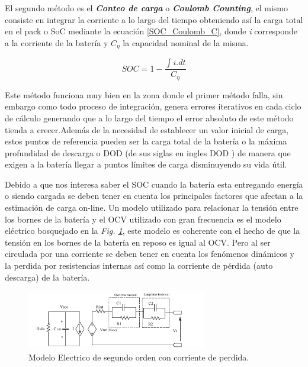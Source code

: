 \documentclass[10pt,a4paper]{article}
\begin{document}
	El segundo método es el \textbf{\emph{Conteo de carga}} o \textbf{\emph{Coulomb Counting}}, el mismo consiste en integrar la corriente a lo largo del tiempo obteniendo así la carga total en el pack o SoC mediante la ecuación \ref{SOC_Coulomb_C}, donde \emph{i} corresponde a la corriente de la batería y $C_\eta$ la capacidad nominal de la misma.
	
	\begin{equation}
		SOC=1-\frac{\int{i.dt}}{C_\eta}
        \label{SOC_Coulomb_C}
	\end{equation}	

	Este método funciona muy bien en la zona donde el primer método falla, sin embargo como todo proceso de integración, genera errores iterativos en cada ciclo de cálculo generando que a lo largo del tiempo el error absoluto de este método tienda a crecer.Además de la necesidad de establecer un valor inicial de carga, estos puntos de referencia pueden ser la carga total de la batería o la máxima profundidad de descarga o DOD (de sus siglas en ingles \acrfull{DOD} ) de manera que exigen a la batería llegar a puntos límites de carga disminuyendo su vida útil.
	
	Debido a que nos interesa saber el \acrshort{SOC} cuando la batería esta entregando energía o siendo cargada se deben tener en cuenta los principales factores que afectan a la estimación de carga on-line. Un modelo utilizado para relacionar la tensión entre los bornes de la batería y el \acrshort{OCV} utilizado con gran frecuencia es el modelo eléctrico bosquejado en la \emph{Fig. \ref{Electric_model}}, este modelo es coherente con el hecho de que la tensión en los bornes de la batería en reposo es igual al \acrshort{OCV}. Pero al ser circulada por una corriente se deben tener en cuenta los fenómenos dinámicos  y la perdida por resistencias internas así como la corriente de pérdida (auto descarga) de la batería.
	
	\begin{figure}[h!]
		\begin{center}
			\includegraphics[width=0.7\textwidth]{electric_battery_model_2_order.png}
			\caption{Modelo Electrico de segundo orden con corriente de perdida.}
			\label{Electric_model}
		\end{center}
	\end{figure}
\end{document}
